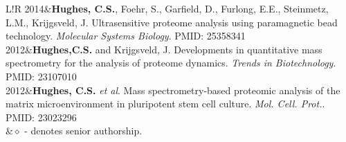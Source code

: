 \documentclass[11pt]{article}
\newcommand\VRule{\color{lightgray}\vrule width 0.5pt}
\begin{document}
{\begin{tabular}{L!{\VRule}R}
	2014&\textbf{Hughes, C.S.}, Foehr, S., Garfield, D., Furlong, E.E., Steinmetz, L.M., Krijgsveld, J. Ultrasensitive proteome analysis using paramagnetic bead
	technology. \textit{Molecular Systems Biology}. PMID: 25358341\\
	2012&\textbf{Hughes,C.S.} and Krijgsveld, J. Developments in quantitative mass spectrometry for the analysis of proteome dynamics. \textit{Trends in Biotechnology}. PMID: 23107010\\
	2012&\textbf{Hughes, C.S.} \textit{et al}. Mass spectrometry-based proteomic analysis of the matrix microenvironment in pluripotent stem cell culture.
	\textit{Mol. Cell. Prot.}. PMID: 23023296\\
	&$\diamond$ - denotes senior authorship.\\
\end{tabular}


}
\end{document}
